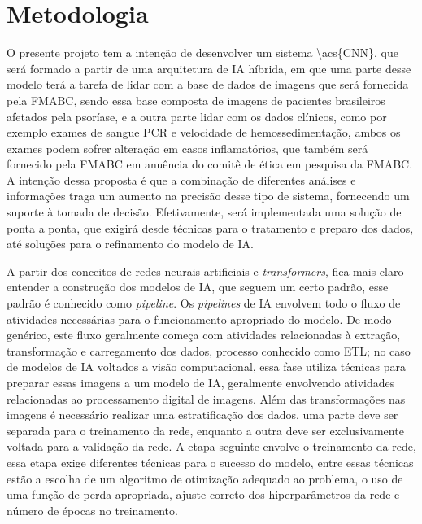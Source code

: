 \section{Metodologia}

O presente projeto tem a intenção de desenvolver um sistema \acs{\acs{CNN}}, que será formado a partir de uma arquitetura de \acs{IA} híbrida, em que uma parte desse modelo terá a tarefa de lidar com a base de dados de imagens que será fornecida pela \ac{FMABC}, sendo essa base composta de imagens de pacientes brasileiros afetados pela psoríase, e a outra parte lidar com os dados clínicos, como por exemplo exames de sangue PCR e velocidade de hemossedimentação, ambos os exames podem sofrer alteração em casos inflamatórios, que também será fornecido pela \acs{FMABC} em anuência do comitê de ética em pesquisa da \acs{FMABC}. A intenção dessa proposta é que a combinação de diferentes análises e informações traga um aumento na precisão desse tipo de sistema, fornecendo um suporte à tomada de decisão. Efetivamente, será implementada uma solução de ponta a ponta, que exigirá desde técnicas para o tratamento e preparo dos dados, até soluções para o refinamento do modelo de \acs{IA}.


A partir dos conceitos de redes neurais artificiais e \textit{transformers}, fica mais claro entender a construção dos modelos de \acs{IA}, que seguem um certo padrão, esse padrão é conhecido como \textit{pipeline}. Os \textit{pipelines} de \acs{IA} envolvem todo o fluxo de atividades necessárias para o funcionamento apropriado do modelo. De modo genérico, este fluxo geralmente começa com atividades relacionadas à extração, transformação e carregamento dos dados, processo conhecido como \ac{ETL}; no caso de modelos de \acs{IA} voltados a visão computacional, essa fase utiliza técnicas para preparar essas imagens a um modelo de \acs{IA}, geralmente envolvendo atividades relacionadas ao processamento digital de imagens. Além das transformações nas imagens é necessário realizar uma estratificação dos dados, uma parte deve ser separada para o treinamento da rede, enquanto a outra deve ser exclusivamente voltada para a validação da rede. A etapa seguinte envolve o treinamento da rede, essa etapa exige diferentes técnicas para o sucesso do modelo, entre essas técnicas estão a escolha de um algoritmo de otimização adequado ao problema, o uso de uma função de perda apropriada, ajuste correto dos hiperparâmetros da rede e número de épocas no treinamento.

